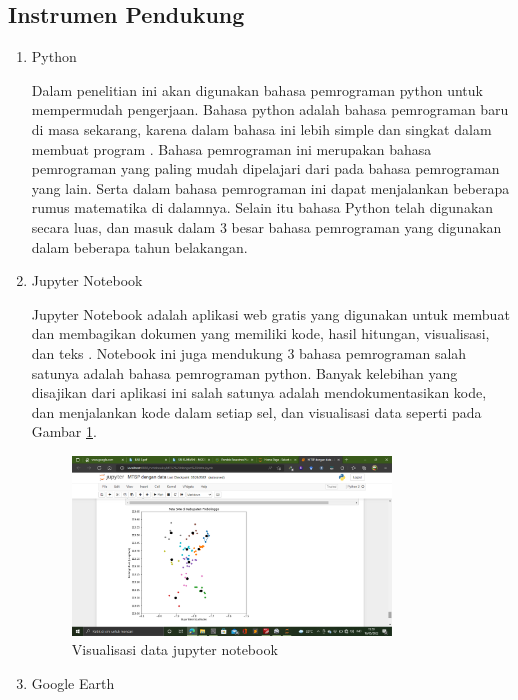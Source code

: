 \subsection{Instrumen Pendukung}
\begin{enumerate}
    \item Python
    
    Dalam penelitian ini akan digunakan bahasa pemrograman python untuk mempermudah pengerjaan. Bahasa python adalah bahasa pemrograman baru di masa sekarang, karena dalam bahasa ini lebih simple dan singkat dalam membuat program \cite{syahrudin2018input}. Bahasa pemrograman ini merupakan bahasa pemrograman yang paling mudah dipelajari dari pada bahasa pemrograman yang lain. Serta dalam bahasa pemrograman ini dapat menjalankan beberapa rumus matematika di dalamnya. Selain itu bahasa Python telah digunakan secara luas, dan masuk dalam 3 besar bahasa pemrograman yang digunakan dalam beberapa tahun belakangan.
    
    \item Jupyter Notebook
    
    Jupyter Notebook adalah aplikasi web gratis yang digunakan untuk membuat dan membagikan dokumen yang memiliki kode, hasil hitungan, visualisasi, dan teks \cite{Kluyver2016jupyter}. Notebook ini juga mendukung 3 bahasa pemrograman salah satunya adalah bahasa pemrograman python. Banyak kelebihan yang disajikan dari aplikasi ini salah satunya adalah mendokumentasikan kode, dan menjalankan kode dalam setiap sel, dan visualisasi data seperti pada Gambar \ref{fig:visjupyter}.

\begin{figure}[H]
  \centering
  \includegraphics[width=0.8\textwidth]{Gambar/visualisasi jupyter.png}
  \caption{Visualisasi data jupyter notebook}
  \label{fig:visjupyter}
\end{figure}

	\item Google Earth
	

\end{enumerate}
